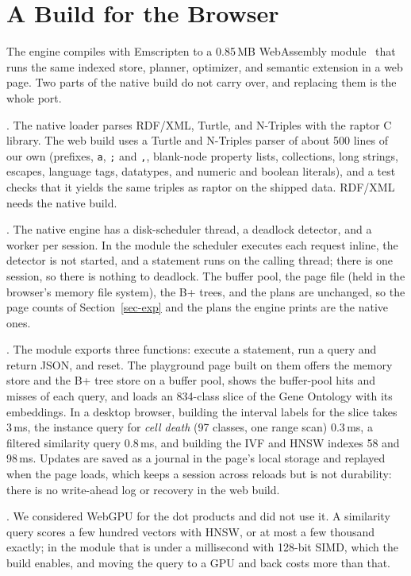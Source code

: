 \section{A Build for the Browser}
\label{sec-system}

The engine compiles with Emscripten to a 0.85\,MB WebAssembly
module~\cite{haas2017} that runs the same indexed store, planner, optimizer,
and semantic extension in a web page.
Two parts of the native build do not carry over, and replacing them is the
whole port.

.
The native loader parses RDF/XML, Turtle, and N-Triples with the raptor C
library.
The web build uses a Turtle and N-Triples parser of about 500 lines of our own
(prefixes, \texttt{a}, \texttt{;} and \texttt{,}, blank-node property lists,
collections, long strings, escapes, language tags, datatypes, and numeric and
boolean literals), and a test checks that it yields the same triples as
raptor on the shipped data.
RDF/XML needs the native build.

.
The native engine has a disk-scheduler thread, a deadlock detector, and a
worker per session.
In the module the scheduler executes each request inline, the detector is not
started, and a statement runs on the calling thread; there is one session, so
there is nothing to deadlock.
The buffer pool, the page file (held in the browser's memory file system), the
B+ trees, and the plans are unchanged, so the page counts of
Section~\ref{sec-exp} and the plans the engine prints are the native ones.

.
The module exports three functions: execute a statement, run a query and
return JSON, and reset.
The playground page built on them offers the memory store and the B+ tree
store on a buffer pool, shows the buffer-pool hits and misses of each query,
and loads an 834-class slice of the Gene Ontology with its embeddings.
In a desktop browser, building the interval labels for the slice takes 3\,ms,
the instance query for \emph{cell death} (97 classes, one range scan) 0.3\,ms,
a filtered similarity query 0.8\,ms, and building the IVF and HNSW indexes
58 and 98\,ms.
Updates are saved as a journal in the page's local storage and replayed when
the page loads, which keeps a session across reloads but is not durability:
there is no write-ahead log or recovery in the web build.

.
We considered WebGPU for the dot products and did not use it.
A similarity query scores a few hundred vectors with HNSW, or at most a few
thousand exactly; in the module that is under a millisecond with 128-bit SIMD,
which the build enables, and moving the query to a GPU and back costs more
than that.
